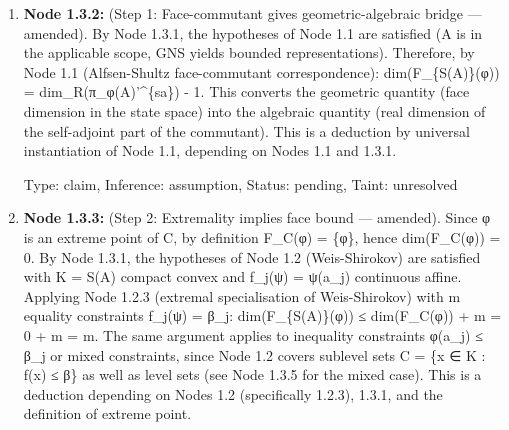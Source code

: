 \documentclass{article}
\begin{document}
\begin{enumerate}
\begin{enumerate}
(ii) Compactness of K = S(A): For C*-algebras, states lie in the unit ball of A* which is weak-* compact by Banach-Alaoglu. For Archimedean order unit spaces, the order-unit norm gives a Banach space structure and Banach-Alaoglu applies. For *-algebras with Archimedean quadratic module, S\_M is compact in the pointwise topology by Tychonoff's theorem (S\_M embeds as a closed subset of a product of compact intervals, using the Archimedean bounds). In all cases K = S(A) (or S\_M) is compact convex.

(iii) Continuity of constraint functionals: The functionals f\_j(ψ) = ψ(a\_j) are continuous affine on S(A) by DEFINITION of the weak-* (or pointwise) topology — evaluation at a fixed element is continuous by the very definition of this topology. This holds regardless of whether A has a norm. The Weis-Shirokov theorem (Node 1.2) applies with K = S(A) and m constraints.

Note: For GENERAL *-algebras without the Archimedean property, the GNS construction may give unbounded operators, the commutant is not well-defined in the standard sense, and the state space need not be compact. The theorem does not apply in that generality. This node is a verification/deduction step, not an assumption.

  Type: claim, Inference: assumption, Status: pending, Taint: unresolved

\item \textbf{Node 1.3.2:} (Step 1: Face-commutant gives geometric-algebraic bridge — amended). By Node 1.3.1, the hypotheses of Node 1.1 are satisfied (A is in the applicable scope, GNS yields bounded representations). Therefore, by Node 1.1 (Alfsen-Shultz face-commutant correspondence): dim(F\_\{S(A)\}(φ)) = dim\_R(π\_φ(A)'\textasciicircum{}\{sa\}) - 1. This converts the geometric quantity (face dimension in the state space) into the algebraic quantity (real dimension of the self-adjoint part of the commutant). This is a deduction by universal instantiation of Node 1.1, depending on Nodes 1.1 and 1.3.1.

  Type: claim, Inference: assumption, Status: pending, Taint: unresolved

\item \textbf{Node 1.3.3:} (Step 2: Extremality implies face bound — amended). Since φ is an extreme point of C, by definition F\_C(φ) = \{φ\}, hence dim(F\_C(φ)) = 0. By Node 1.3.1, the hypotheses of Node 1.2 (Weis-Shirokov) are satisfied with K = S(A) compact convex and f\_j(ψ) = ψ(a\_j) continuous affine. Applying Node 1.2.3 (extremal specialisation of Weis-Shirokov) with m equality constraints f\_j(ψ) = β\_j: dim(F\_\{S(A)\}(φ)) ≤ dim(F\_C(φ)) + m = 0 + m = m. The same argument applies to inequality constraints φ(a\_j) ≤ β\_j or mixed constraints, since Node 1.2 covers sublevel sets C = \{x ∈ K : f(x) ≤ β\} as well as level sets (see Node 1.3.5 for the mixed case). This is a deduction depending on Nodes 1.2 (specifically 1.2.3), 1.3.1, and the definition of extreme point.


\end{enumerate}
\end{enumerate}
\end{document}
